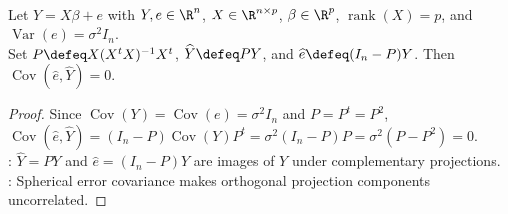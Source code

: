 \begin{proposition} \label{prop:residuals-uncorrelated-with-fitted-values} \\
Let $Y=X\beta+e$ with $Y,e\in\R^n$, $X\in\R^{n\times p}$, $\beta\in\R^p$, $\operatorname{rank}(X)=p$, and $\operatorname{Var}(e)=\sigma^2I_n$.\\
Set $P\defeq X(X^tX)^{-1}X^t$, $\widehat{Y}\defeq PY$, and $\widehat{e}\defeq(I_n-P)Y$. Then $\operatorname{Cov}(\widehat{e},\widehat{Y})=0$.
\begin{proof} Since $\operatorname{Cov}(Y)=\operatorname{Cov}(e)=\sigma^2I_n$ and $P=P^t=P^2$,\\
$\operatorname{Cov}(\widehat{e},\widehat{Y})=(I_n-P)\operatorname{Cov}(Y)P^t=\sigma^2(I_n-P)P=\sigma^2(P-P^2)=0$.\\
: $\widehat{Y}=PY$ and $\widehat{e}=(I_n-P)Y$ are images of $Y$ under complementary projections.\\
: Spherical error covariance makes orthogonal projection components uncorrelated.
\end{proof}
\end{proposition}
